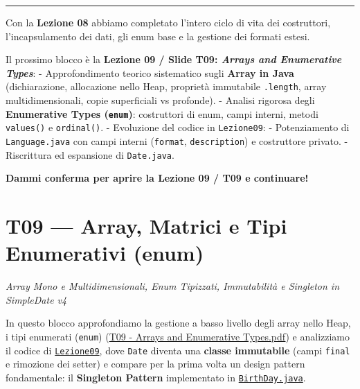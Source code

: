 \documentclass[11pt,a4paper,oneside]{report}
\newcommand{\passthrough}[1]{#1}
\begin{document}
\begin{center}\rule{0.5\linewidth}{0.5pt}\end{center}

\begin{studynote} Con la \textbf{Lezione 08} abbiamo completato l'intero ciclo
di vita dei costruttori, l'incapsulamento dei dati, gli enum base e la
gestione dei formati estesi.

Il prossimo blocco è la \textbf{Lezione 09 / Slide T09: \emph{Arrays and
Enumerative Types}}: - Approfondimento teorico sistematico sugli
\textbf{Array in Java} (dichiarazione, allocazione nello Heap, proprietà
immutabile \passthrough{\lstinline!.length!}, array multidimensionali,
copie superficiali vs profonde). - Analisi rigorosa degli
\textbf{Enumerative Types (\passthrough{\lstinline!enum!})}: costruttori
di enum, campi interni, metodi \passthrough{\lstinline!values()!} e
\passthrough{\lstinline!ordinal()!}. - Evoluzione del codice in
\passthrough{\lstinline!Lezione09!}: - Potenziamento di
\passthrough{\lstinline!Language.java!} con campi interni
(\passthrough{\lstinline!format!},
\passthrough{\lstinline!description!}) e costruttore privato. -
Riscrittura ed espansione di \passthrough{\lstinline!Date.java!}.
\end{studynote}

\textbf{Dammi conferma per aprire la Lezione 09 / T09 e continuare!}

\newpage
\chapter[T09 --- Array, Matrici e Tipi Enumerativi (]{T09 --- Array, Matrici e Tipi Enumerativi (enum)}
\label{chap:t09}

{\small\sffamily\color{accentblue!80!black}\textit{Array Mono e Multidimensionali, Enum Tipizzati, Immutabilità e Singleton in SimpleDate v4}}

\vspace{0.8em}

In questo blocco approfondiamo la gestione a basso livello degli array
nello Heap, i tipi enumerati (\passthrough{\lstinline!enum!})
(\href{file:///home/wally/Documenti/GitHub/Programmazione-II/25-26/Teoria-e-Esercitazioni/Slides-20260902/T09\%20-\%20Arrays\%20and\%20Enumerative\%20Types.pdf}{T09
- Arrays and Enumerative Types.pdf}) e analizziamo il codice di
\href{file:///home/wally/Documenti/GitHub/Programmazione-II/25-26/Teoria-e-Esercitazioni/Codice-20260902/Lezione09/SimpleDate/src}{\passthrough{\lstinline!Lezione09!}},
dove \passthrough{\lstinline!Date!} diventa una \textbf{classe
immutabile} (campi \passthrough{\lstinline!final!} e rimozione dei
setter) e compare per la prima volta un design pattern fondamentale: il
\textbf{Singleton Pattern} implementato in
\href{file:///home/wally/Documenti/GitHub/Programmazione-II/25-26/Teoria-e-Esercitazioni/Codice-20260902/Lezione09/SimpleDate/src/BirthDay.java}{\passthrough{\lstinline!BirthDay.java!}}.
\end{document}
